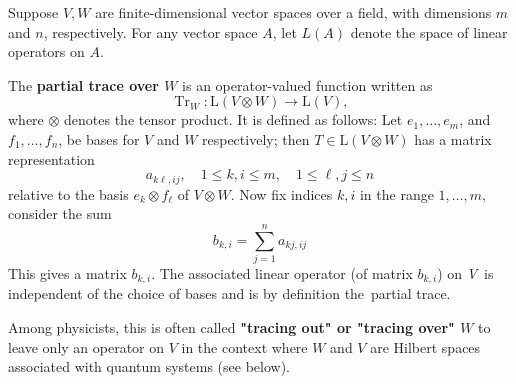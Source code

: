 Suppose $V, W$ are finite-dimensional vector spaces over a field, with dimensions $m$ and $n$, respectively. 
For any vector space $A$, let $L(A)$ denote the space of linear operators on $A$.

\begin{definition}\label{defn:partial-trace-1}
The \textbf{partial trace over $W$} is an operator-valued function written as
$$
\operatorname{Tr}_W: \mathrm{L}(V \otimes W) \rightarrow \mathrm{L}(V),
$$
where $\otimes$ denotes the tensor product. It is defined as follows: Let $e_1, \ldots, e_m$, and $f_1, \ldots, f_n$, be bases for $V$ and $W$ respectively; then $T \in \mathrm{L}(V \otimes W)$ has a matrix representation
$$
a_{k \ell, i j}, \quad 1 \leq k, i \leq m, \quad 1 \leq \ell, j \leq n
$$
relative to the basis $e_k \otimes f_{\ell}$ of $V \otimes W$. Now fix indices $k, i$ in the range $1, \ldots, m$, consider the sum
$$
b_{k, i}=\sum_{j=1}^n a_{k j, i j}
$$
This gives a matrix $b_{k, i}$. The associated linear operator (of matrix $b_{k, i}$) on \textit{V} is independent of the choice of bases and is by definition the partial trace.
\end{definition}

Among physicists, this is often called \textbf{"tracing out" or "tracing over" $W$} to leave only an operator on $V$ in the context where $W$ and $V$ are Hilbert spaces associated with quantum systems (see below).